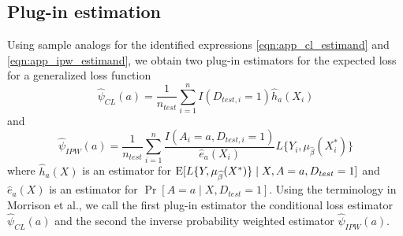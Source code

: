     \subsection{Plug-in estimation}
    Using sample analogs for the identified expressions \ref{eqn:app_cl_estimand} and \ref{eqn:app_ipw_estimand}, we obtain two plug-in estimators for the expected loss for a generalized loss function
    \begin{equation*}
        \widehat{\psi}_{CL}(a) = \frac{1}{n_{test}}\sum_{i=1}^nI(D_{test, i} = 1)\widehat{h}_a(X_i)
    \end{equation*}
    and 
    \begin{equation*}
        \widehat{\psi}_{IPW}(a) = \frac{1}{n_{test}} \sum_{i=1}^n \frac{I(A_i = a, D_{test, i} = 1)}{ \widehat{e}_a(X_i)} L\{Y_i, \mu_{\widehat{\beta}}(X^*_i)\}
    \end{equation*}
    where $\widehat{h}_a(X)$ is an estimator for $\operatorname{E}[L\{Y, \mu_{\widehat{\beta}}(X^*)\}\mid X,A = a, D_{test} = 1]$ and $\widehat{e}_a(X)$ is an estimator for $\Pr[A = a \mid X,D_{test} = 1]$. Using the terminology in Morrison et al., we call the first plug-in estimator the conditional loss estimator $ \widehat{\psi}_{CL}(a)$ and the second the inverse probability weighted estimator $\widehat{\psi}_{IPW}(a)$. 

